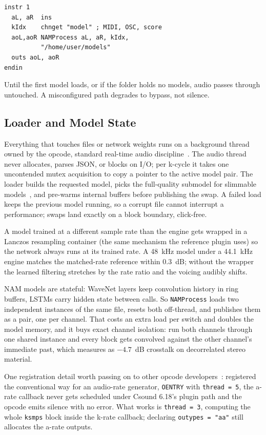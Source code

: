 \documentclass[runningheads,a4paper]{llncs}
\begin{document}
\begin{verbatim}
instr 1
  aL, aR  ins
  kIdx    chnget "model" ; MIDI, OSC, score
  aoL,aoR NAMProcess aL, aR, kIdx,
          "/home/user/models"
  outs aoL, aoR
endin
\end{verbatim}

Until the first model loads, or if the folder holds no models, audio
passes through untouched. A misconfigured path degrades to bypass, not
silence.

\subsection{Loader and Model State}
\label{sec:loader}

Everything that touches files or network weights runs on a background
thread owned by the opcode, standard real-time audio
discipline~\cite{bencina2011realtime}. The audio thread never
allocates, parses JSON, or blocks on I/O; per k-cycle it takes one
uncontended mutex acquisition to copy a pointer to the active model
pair. The loader builds the requested model, picks the full-quality
submodel for slimmable models~\cite{atkinson2025slimmable}, and
pre-warms internal buffers before publishing the swap. A failed load
keeps the previous model running, so a corrupt file cannot interrupt a
performance; swaps land exactly on a block boundary, click-free.

A model trained at a different sample rate than the engine gets wrapped
in a Lanczos resampling container (the same mechanism the reference
plugin uses) so the network always runs at its trained rate. A 48~kHz
model under a 44.1~kHz engine matches the matched-rate reference within
0.3~dB; without the wrapper the learned filtering stretches by the rate
ratio and the voicing audibly shifts.

NAM models are stateful: WaveNet layers keep convolution history in
ring buffers, LSTMs carry hidden state between calls. So
\texttt{NAMProcess} loads two independent instances of the same file,
resets both off-thread, and publishes them as a pair, one per channel.
That costs an extra load per switch and doubles the model memory, and
it buys exact channel isolation: run both channels through one shared
instance and every block gets convolved against the other channel's
immediate past, which measures as $-4.7$~dB crosstalk on decorrelated
stereo material.

One registration detail worth passing on to other opcode
developers~\cite{lazzarini2017cpof}: registered the conventional way
for an audio-rate generator, \texttt{OENTRY} with \texttt{thread = 5},
the a-rate callback never gets scheduled under Csound 6.18's plugin
path and the opcode emits silence with no error. What works is
\texttt{thread = 3}, computing the whole \texttt{ksmps} block inside
the k-rate callback; declaring \texttt{outypes = "aa"} still allocates
the a-rate outputs.
\end{document}
